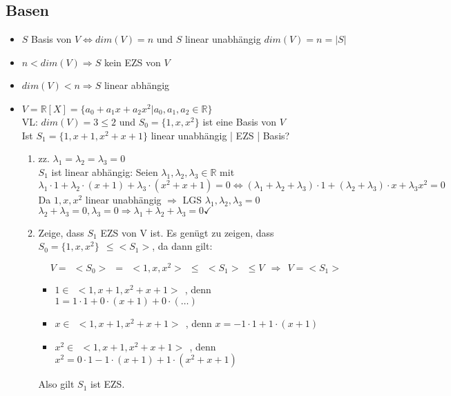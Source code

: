 \documentclass{scrartcl}
\begin{document}
\subsection{Basen}

\begin{itemize}
\item $S$ Basis von $V \Leftrightarrow dim(V) = n$ und $S$ linear unabhängig  $ dim(V) = n = |S|$
\item $n < dim(V) \Rightarrow S $ kein EZS von $V$
\item $dim (V) < n \Rightarrow S $ linear abhängig
\end{itemize}

\begin{Beispiel}
\begin{itemize}
    \item %
		$V= \mathbb{R} [X] = \{a_0 + a_1x + a_2x^2 | a_0, a_1, a_2 \in \mathbb{R}\} $\\
		VL: $dim(V) = 3 \leq 2$ und $ S_0 = \{ 1, x, x^2\}$ ist eine Basis von $V$\\
		Ist $ S_1 = \{ 1, x + 1, x^2 + x + 1\}$ linear unabhängig | EZS | Basis?
		\begin{enumerate}[label={(\arabic*)}]
			\item %
			zz. $\lambda_1 = \lambda_2 =  \lambda_3 = 0$\\
			$S_1$ ist linear abhängig: Seien $\lambda_1, \lambda_2, \lambda_3 \in \mathbb{R}$ mit $\lambda_1 \cdot 1 + \lambda_2 \cdot (x+1) + \lambda_3 \cdot (x^2 + x + 1) = 0 \Leftrightarrow (\lambda_1 + \lambda_2 +  \lambda_3) \cdot 1 + ( \lambda_2 +  \lambda_3) \cdot x + \lambda_3x^2 = 0 $\\
			Da $1,x,x^2$ linear unabhängig $\Rightarrow$ LGS $\lambda_1, \lambda_2, \lambda_3 = 0 $\\
			$ \lambda_2 + \lambda_3 = 0, \lambda_3 = 0 \Rightarrow \lambda_1 + \lambda_2 + \lambda_3 = 0 \checkmark$ 
			
			\item %
			Zeige, dass $S_1$ EZS von V ist. Es genügt zu zeigen, dass $S_0=\{1,x,x^2\} ~~\leq <S_1>$, da dann gilt:
			
			\[V = ~~ <S_0> ~~ = ~~ <1, x,x^2> ~~ \leq ~~ <S_1> ~~ \leq V ~~ \Rightarrow ~~ V = <S_1>\]
			
			\begin{itemize}
			\item $ 1 \in ~~ < 1, x + 1, x^2 + x + 1> ~~$, denn $1 = 1 \cdot 1 + 0 \cdot (x+1) + 0 \cdot (\dots)$ 
			\item $ x \in ~~ < 1, x + 1, x^2 + x + 1> ~~$, denn $x = -1 \cdot 1 + 1 \cdot (x+1)$ 
			\item $ x^2 \in ~~ < 1, x + 1, x^2 + x + 1> ~~$, denn $x^2 = 0 \cdot 1 - 1 \cdot (x+1) + 1 \cdot (x^2 + x + 1)$ 
			\end{itemize}
			Also gilt $S_1$ ist EZS.
			

\end{enumerate}
\end{itemize}
\end{Beispiel}
\end{document}
